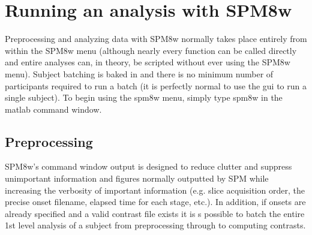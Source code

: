 \documentclass[12pt]{article}
\begin{document}
\section{Running an analysis with SPM8w}
\secttoc %
Preprocessing and analyzing data with SPM8w normally takes place entirely from within the SPM8w menu (although nearly every function can be called directly and entire analyses can, in theory, be scripted without ever using the SPM8w menu). Subject batching is baked in and there is no minimum number of participants required to run a batch (it is perfectly normal to use the gui to run a single subject). To begin using the spm8w menu, simply type spm8w in the matlab command window.

\vspace{\baselineskip}
\noindent%
\begin{minipage}{\linewidth}
\end{minipage}

\subsection{Preprocessing}
SPM8w's command window output is designed to reduce clutter and suppress unimportant information and figures normally outputted by SPM while increasing the verbosity of important information (e.g. slice acquisition order, the precise onset filename, elapsed time for each stage, etc.). In addition, if onsets are already specified and a valid contrast file exists it is s possible to batch the entire 1st level analysis of a subject from preprocessing through to computing contrasts.
\end{document}
